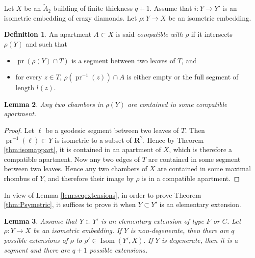 \documentclass[a4paper, 11pt]{article}
\theoremstyle{plain}
\newtheorem{proposition}{Proposition}[section]
\newtheorem{lemma}[proposition]{Lemma}
\theoremstyle{definition}
\newtheorem{definition}[proposition]{Definition}
\theoremstyle{remark}
\DeclareMathOperator{\Isom}{Isom}
\DeclareMathOperator{\pr}{pr}
\newcommand{\RR}{\mathbf{R}}                          %
\begin{document}
Let $X$ be an $\tilde A_2$ building of finite thickness $q+1$. Assume that $i:Y\to Y'$ is an isometric embedding of crazy diamonds. Let $\rho:Y\to X$ be an isometric embedding. 


%

\begin{definition}
An apartment $A\subset X$ is said \emph{compatible with $\rho$} if it intersects $\rho(Y)$ and such that
\begin{itemize}
\item $\pr(\rho(Y)\cap T)$ is a segment between two leaves of $T$, and
\item for every $z\in T$,
 $\rho(\pr^{-1}(z))\cap A$ is either empty or the full segment of length
 $l(z)$.
\end{itemize} 
\end{definition}

\begin{lemma}\label{lem:compatible}
Any two chambers in $\rho(Y)$ are contained in some compatible apartment.
\end{lemma}

\begin{proof}
Let $\ell$ be a geodesic segment between two leaves of $T$. Then $\pr^{-1}(\ell)\subset Y$ is isometric to a subset of $\RR^2$. Hence
 by Theorem \ref{thm:isomappart}, it is contained in an apartment of $X$, which is therefore a compatible apartment.
Now any two edges of $T$ are contained in some segment between two leaves. Hence any two chambers of $X$ are contained in some maximal rhombus of $Y$, and therefore their image by $\rho$ is in a compatible apartment.
\end{proof}

In view of Lemma \ref{lem:seqextensions}, in order to prove Theorem \ref{thm:Psymetric}, it suffices to prove it when $Y\subset Y'$ is an elementary extension. 

\begin{lemma}\label{lem:extFC}
Assume that $Y\subset Y'$ is an elementary extension of type $F$ or $C$. Let $\rho:Y\to X$ be an isometric embedding. If $Y$ is non-degenerate, then there are $q$ possible extensions of $\rho$ to $\rho'\in \Isom(Y', X)$. If $Y$ is degenerate, then it is a segment and there are $q+1$ possible extensions.
\end{lemma}
\end{document}

